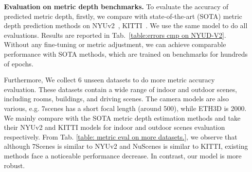 \noindent\textbf{Evaluation on metric depth benchmarks.} To evaluate the accuracy of predicted metric depth, firstly,  we compare with state-of-the-art (SOTA) metric depth prediction methods on NYUv2~\cite{silberman2012indoor}, KITTI~\cite{geiger2012we}.
We use the same model to do %
all evaluations. %
Results are reported in Tab.~\ref{table:errors cmp on NYUD-V2}. Without any fine-tuning or metric adjustment,  we can achieve comparable performance with SOTA methods, which are trained on benchmarks for hundreds of epochs. %







Furthermore, We collect $6$ unseen datasets to do more metric accuracy evaluation. These datasets contain a wide range of indoor and outdoor scenes, including rooms, buildings, and driving scenes. The camera models are also various, e.g. 7scenes has a short focal length (around 500), while ETH3D is 2000. We mainly compare with the SOTA metric depth estimation methods and take their NYUv2 and KITTI models for indoor and outdoor scenes evaluation respectively. From Tab. \ref{table: metric eval on more datasets.}, we observe that although 7Scenes is similar to NYUv2 and NuScenes is similar to KITTI, existing methods face a noticeable performance decrease. In contrast, our model is more robust. %

